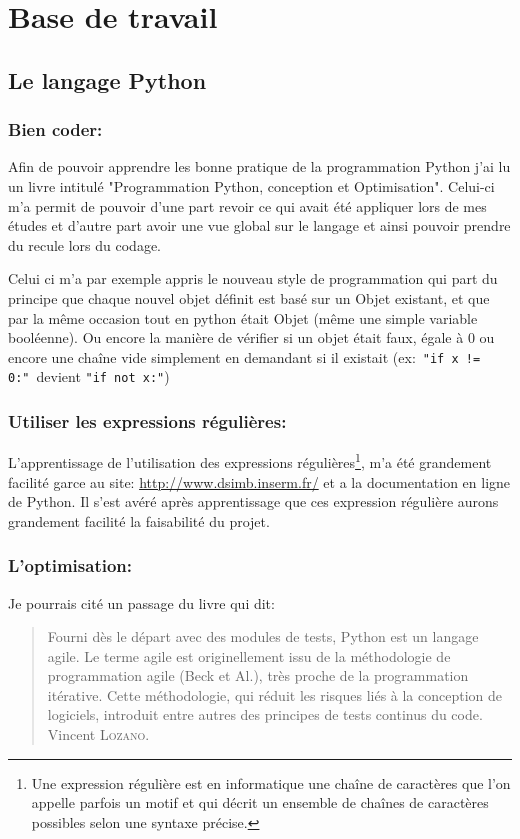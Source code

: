 \section{Base de travail}
    \subsection{Le langage Python}
        \subsubsection{Bien coder:\label{pygood}}
Afin de pouvoir apprendre les bonne pratique de la programmation Python j'ai lu un livre intitulé "Programmation Python, conception et Optimisation"\cite{pybook}. Celui-ci m'a permit de pouvoir d'une part revoir ce qui avait été appliquer lors de mes études et d'autre part avoir une vue global sur le langage et ainsi pouvoir prendre du recule lors du codage.

Celui ci m'a par exemple appris le nouveau style de programmation qui part du principe que chaque nouvel objet définit est basé sur un Objet existant, et que par la même occasion tout en python était Objet (même une simple variable booléenne). Ou encore la manière de vérifier si un objet était faux, égale à 0 ou encore une chaîne vide simplement en demandant si il existait (ex:~\texttt{"if x != 0:"}~devient \texttt{"if not x:"})

        \subsubsection{Utiliser les expressions régulières:} 
L'apprentissage de l'utilisation des expressions régulières\footnote{Une expression régulière est en informatique une chaîne de caractères que l’on appelle parfois un motif et qui décrit un ensemble de chaînes de caractères possibles selon une syntaxe précise.}, m'a été grandement facilité garce au site: \url{http://www.dsimb.inserm.fr/}\cite{re} et a la documentation en ligne de Python\cite{pydoc}. Il s'est avéré après apprentissage que ces expression régulière aurons grandement facilité la faisabilité du projet.

        \subsubsection{L'optimisation:}
Je pourrais cité un passage du livre\cite{pybook} qui dit:
\begin{quotation}
    Fourni dès le départ avec des modules de tests, Python est un langage agile. Le terme agile est originellement issu de la méthodologie de programmation agile (Beck et Al.), très proche de la programmation itérative. Cette méthodologie, qui réduit les risques liés à la conception de logiciels, introduit entre autres des principes de tests continus du code.
    \raggedleft Vincent \textsc{Lozano}.
\end{quotation}

